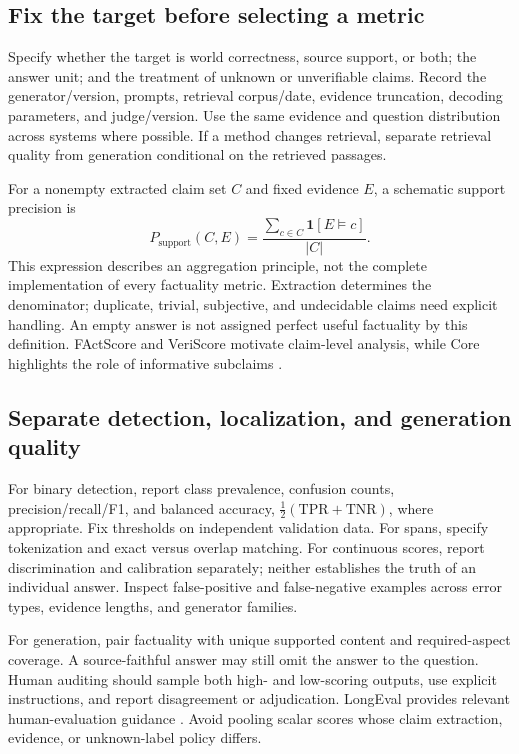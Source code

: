 \subsection{Fix the target before selecting a metric}
Specify whether the target is world correctness, source support, or both; the answer unit; and the treatment of unknown or unverifiable claims. Record the generator/version, prompts, retrieval corpus/date, evidence truncation, decoding parameters, and judge/version. Use the same evidence and question distribution across systems where possible. If a method changes retrieval, separate retrieval quality from generation conditional on the retrieved passages.

For a nonempty extracted claim set $C$ and fixed evidence $E$, a schematic support precision is
\begin{equation}
P_{\mathrm{support}}(C,E)=\frac{\sum_{c\in C}\mathbf{1}[E\models c]}{|C|}.
\end{equation}
This expression describes an aggregation principle, not the complete implementation of every factuality metric. Extraction determines the denominator; duplicate, trivial, subjective, and undecidable claims need explicit handling. An empty answer is not assigned perfect useful factuality by this definition. FActScore and VeriScore motivate claim-level analysis, while Core highlights the role of informative subclaims \citep{min-etal-2023-factscore,song-etal-2024-veriscore,jiang-etal-2025-core}.

\subsection{Separate detection, localization, and generation quality}
For binary detection, report class prevalence, confusion counts, precision/recall/F1, and balanced accuracy, $\tfrac12(\mathrm{TPR}+\mathrm{TNR})$, where appropriate. Fix thresholds on independent validation data. For spans, specify tokenization and exact versus overlap matching. For continuous scores, report discrimination and calibration separately; neither establishes the truth of an individual answer. Inspect false-positive and false-negative examples across error types, evidence lengths, and generator families.

For generation, pair factuality with unique supported content and required-aspect coverage. A source-faithful answer may still omit the answer to the question. Human auditing should sample both high- and low-scoring outputs, use explicit instructions, and report disagreement or adjudication. LongEval provides relevant human-evaluation guidance \citep{krishna-etal-2023-longeval}. Avoid pooling scalar scores whose claim extraction, evidence, or unknown-label policy differs.

